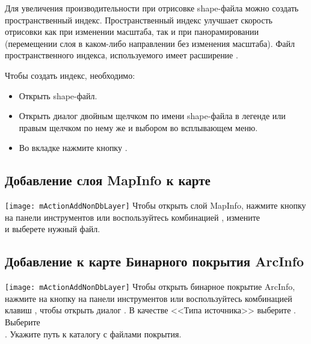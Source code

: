 Для увеличения производительности при отрисовке shape-файла можно создать
пространственный индекс. Пространственный индекс 
улучшает скорость отрисовки как при изменении масштаба, так и при
панорамировании (перемещении слоя в каком-либо направлении без изменения
масштаба). Файл пространственного индекса, используемого \qg имеет
расширение .

Чтобы создать индекс, необходимо:

\begin{itemize}[label=--]
\item Открыть shape-файл.
\item Открыть диалог  двойным щелчком по имени
shape-файла в легенде или правым щелчком по нему же и выбором
 во всплывающем меню.
\item Во вкладке  нажмите кнопку .
\end{itemize}

\subsection{Добавление слоя MapInfo к карте}

\texttt{[image: mActionAddNonDbLayer]} Чтобы открыть слой
MapInfo, нажмите кнопку  на панели инструментов или воспользуйтесь комбинацией
, измените \\
и выберете нужный файл.

\subsection{Добавление к карте Бинарного покрытия ArcInfo}

\texttt{[image: mActionAddNonDbLayer]} Чтобы открыть бинарное
покрытие ArcInfo, нажмите на кнопку
 на панели
инструментов или воспользуйтесь комбинацией клавиш ,
чтобы открыть диалог . В качестве
<<Типа источника>> выберите . Выберите \\
. Укажите путь к каталогу
с файлами покрытия.


